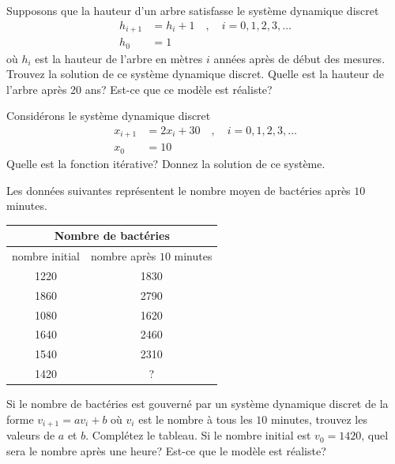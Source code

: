 \begin{question}[\life]
Supposons que la hauteur d'un arbre satisfasse le système dynamique discret
\begin{align*}
h_{i+1} &= h_i + 1 \quad , \quad i=0, 1, 2, 3, \ldots \\
h_0 &= 1
\end{align*}
où $h_i$ est la hauteur de l'arbre en mètres $i$ années après de début des
mesures.  Trouvez la solution de ce système dynamique discret.  Quelle est la
hauteur de l'arbre après $20$ ans?  Est-ce que ce modèle est réaliste?
\label{6Q76}
\end{question}

\begin{question}[\life]
Considérons le système dynamique discret
\begin{align*}
x_{i+1} &= 2x_i + 30 \quad , \quad i=0, 1, 2, 3, \ldots \\
x_0 &= 10
\end{align*}
Quelle est la fonction itérative?  Donnez la solution de ce système.
\label{6Q77}
\end{question}

\begin{question}[\life]
Les données suivantes représentent le nombre moyen de bactéries après
$10$ minutes.
\begin{center}
\begin{tabular}{c|c}
\multicolumn{2}{c}{Nombre de bactéries} \\
\hline
nombre initial & nombre après $10$ minutes \\
\hline
1220 & 1830 \\
1860 & 2790 \\
1080 & 1620 \\
1640 & 2460 \\
1540 & 2310 \\
1420 & ?
\end{tabular}
\end{center}
Si le nombre de bactéries est gouverné par un système dynamique
discret de la forme $v_{i+1} = a v_i + b$ où $v_i$ est le nombre à
tous les $10$ minutes, trouvez les valeurs de $a$ et $b$.  Complétez
le tableau.  Si le nombre initial est $v_0 = 1420$, quel sera le
nombre après une heure?  Est-ce que le modèle est réaliste?
\label{6Q78}
\end{question}

